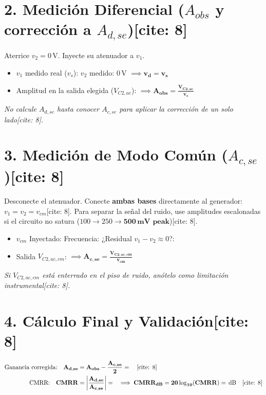 \documentclass[11pt, a4paper]{article}
\begin{document}
\section*{2. Medición Diferencial ($A_{obs}$ y corrección a $A_{d,se}$)[cite: 8]}
Aterrice $v_2 = 0\,\text{V}$. Inyecte su atenuador a $v_1$.
\begin{itemize}
    \item $v_1$ medido real ($v_s$): \hrulefill \quad $v_2$ medido: $0\,\text{V}$ \quad $\implies \mathbf{v_d = v_s}$ \quad \text{[cite: 8]}
    \item Amplitud en la salida elegida ($V_{C2, ac}$): \hrulefill \quad $\implies \mathbf{A_{obs} = \frac{V_{C2, ac}}{v_s}}$ \quad \text{[cite: 8]}
\end{itemize}
\textit{No calcule $A_{d,se}$ hasta conocer $A_{c,se}$ para aplicar la corrección de un solo lado[cite: 8].}

\section*{3. Medición de Modo Común ($A_{c,se}$)[cite: 8]}
Desconecte el atenuador. Conecte \textbf{ambas bases} directamente al generador: $v_1 = v_2 = v_{cm}$[cite: 8]. Para separar la señal del ruido, use amplitudes escalonadas si el circuito no satura ($100 \to 250 \to \mathbf{500\,\text{mV peak}}$)[cite: 8].
\begin{itemize}
    \item $v_{cm}$ Inyectado: \hrulefill \quad Frecuencia: \hrulefill \quad ¿Residual $v_1 - v_2 \approx 0$?: \hrulefill[cite: 8]
    \item Salida $V_{C2,ac,cm}$: \hrulefill \quad $\implies \mathbf{A_{c,se} = \frac{V_{C2,ac,cm}}{v_{cm}}}$ \quad \text{[cite: 8]}
\end{itemize}
\textit{Si $V_{C2,ac,cm}$ está enterrado en el piso de ruido, anótelo como limitación instrumental[cite: 8].}

\section*{4. Cálculo Final y Validación[cite: 8]}
\begin{align*}
    \text{Ganancia corregida:} \quad \mathbf{A_{d,se}} &= \mathbf{A_{obs} - \frac{A_{c,se}}{2}} = \hrulefill \quad \text{[cite: 8]} \\
    \text{CMRR:} \quad \mathbf{CMRR} &= \mathbf{\left| \frac{A_{d,se}}{A_{c,se}} \right|} = \hrulefill \quad \implies \mathbf{CMRR_{dB}} = \mathbf{20\log_{10}(CMRR)} = \hrulefill\,\text{dB} \quad \text{[cite: 8]}
\end{align*}
\end{document}
